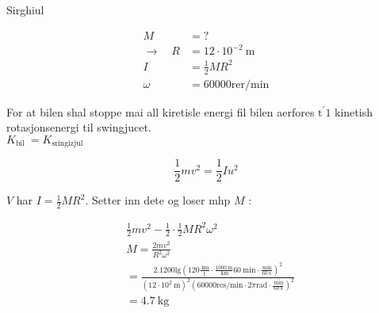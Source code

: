 \documentclass[10pt]{article}
\begin{document}
Sirghiul

$$
\begin{aligned}
M & =? \\
\rightarrow \quad R & =12 \cdot 10^{-2} \mathrm{~m} \\
I & =\frac{1}{2} M R^{2} \\
\omega & =60000 \mathrm{rer} / \mathrm{min}
\end{aligned}
$$

For at bilen shal stoppe mai all kiretisle energi fil bilen aerfores $\mathrm{t}^{\prime} 1$ kinetish rotasjonsenergi til swingjucet.\\
$K_{\text {bil }}=K_{\text {sringizjul }}$

$$
\frac{1}{2} m v^{2}=\frac{1}{2} I u^{2}
$$

$V$ har $I=\frac{1}{2} M R^{2}$. Setter inn dete og loser mhp $M$ :

$$
\begin{aligned}
& \frac{1}{2} m v^{2}-\frac{1}{2} \cdot \frac{1}{2} M R^{2} \omega^{2} \\
& M=\frac{2 m v^{2}}{R^{2} \omega^{2}} \\
&=\frac{2.1200 \mathrm{lg}\left(120 \frac{\mathrm{~km}}{\mathrm{t}} \cdot \frac{1000 \mathrm{~m}}{\mathrm{~km}} 60 \mathrm{~min} \cdot \frac{\mathrm{~min}}{60 \mathrm{~s}}\right)^{2}}{\left(12 \cdot 10^{2} \mathrm{~m}\right)^{2}\left(60000 \mathrm{res} / \mathrm{min} \cdot 2 \pi \mathrm{rad} \cdot \frac{\mathrm{~min}}{60 \mathrm{~s}}\right)^{2}} \\
&=4.7 \mathrm{~kg}
\end{aligned}
$$
\end{document}
